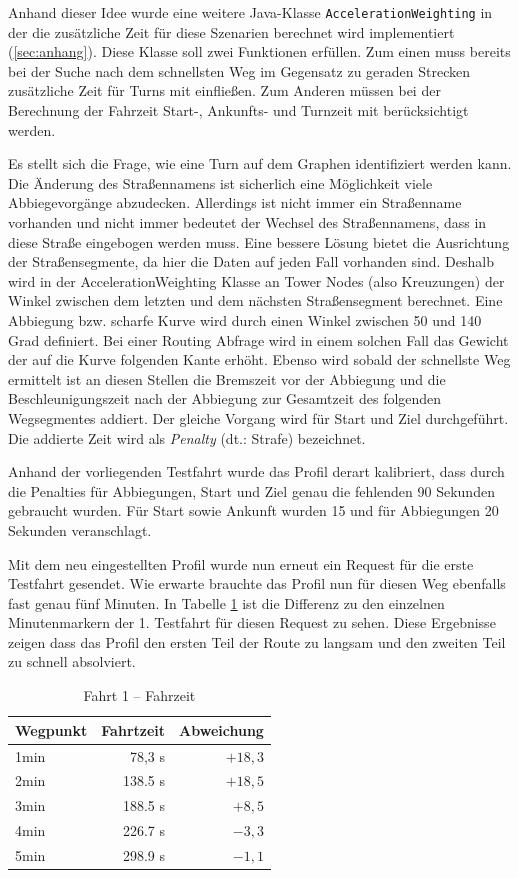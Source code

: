 Anhand dieser Idee wurde eine weitere Java-Klasse \texttt{AccelerationWeighting} in der die zusätzliche Zeit für diese Szenarien berechnet wird implementiert (\ref{sec:anhang}).
Diese Klasse soll zwei Funktionen erfüllen.
Zum einen muss bereits bei der Suche nach dem schnellsten Weg im Gegensatz zu geraden Strecken zusätzliche Zeit für Turns mit einfließen.
Zum Anderen müssen bei der Berechnung der Fahrzeit Start-, Ankunfts- und Turnzeit mit berücksichtigt werden.

Es stellt sich die Frage, wie eine Turn auf dem Graphen identifiziert werden kann.
Die Änderung des Straßennamens ist sicherlich eine Möglichkeit viele Abbiegevorgänge abzudecken.
Allerdings ist nicht immer ein Straßenname vorhanden und nicht immer bedeutet der Wechsel des Straßennamens, dass in diese Straße eingebogen werden muss.
Eine bessere Lösung bietet die Ausrichtung der Straßensegmente, da hier die Daten auf jeden Fall vorhanden sind.
Deshalb wird in der AccelerationWeighting Klasse an Tower Nodes (also Kreuzungen) der Winkel zwischen dem letzten und dem nächsten Straßensegment berechnet.
Eine Abbiegung bzw.
scharfe Kurve wird durch einen Winkel zwischen 50 und 140 Grad definiert.
Bei einer Routing Abfrage wird in einem solchen Fall das Gewicht der auf die Kurve folgenden Kante erhöht.
Ebenso wird sobald der schnellste Weg ermittelt ist an diesen Stellen die Bremszeit vor der Abbiegung und die Beschleunigungszeit nach der Abbiegung zur Gesamtzeit des folgenden Wegsegmentes addiert.
Der gleiche Vorgang wird für Start und Ziel durchgeführt.
Die addierte Zeit wird als \textit{Penalty} (dt.: Strafe) bezeichnet.

Anhand der vorliegenden Testfahrt wurde das Profil derart kalibriert, dass durch die Penalties für Abbiegungen, Start und Ziel genau die fehlenden 90 Sekunden gebraucht wurden.
Für Start sowie Ankunft wurden 15 und für Abbiegungen 20 Sekunden veranschlagt.

Mit dem neu eingestellten Profil wurde nun erneut ein Request für die erste Testfahrt gesendet.
Wie erwarte brauchte das Profil nun für diesen Weg ebenfalls fast genau fünf Minuten.
In Tabelle \ref{tab:drive11} ist die Differenz zu den einzelnen Minutenmarkern der 1. Testfahrt für diesen Request zu sehen.
Diese Ergebnisse zeigen dass das Profil den ersten Teil der Route zu langsam und den zweiten Teil zu schnell absolviert.

\begin{table}[h]
\centering
\caption{Fahrt 1 -- Fahrzeit}
\label{tab:drive11}
\begin{tabular}{|l|r|r|}
\hline
Wegpunkt & Fahrtzeit & Abweichung \\ \hline 
1min & 78,3 s & $+18,3$ \\
2min & 138.5 s & $+18,5$ \\
3min & 188.5 s & $+8,5$ \\
4min & 226.7 s & $-3,3$ \\
5min & 298.9 s & $-1,1$ \\
\hline
\end{tabular}
\end{table}


